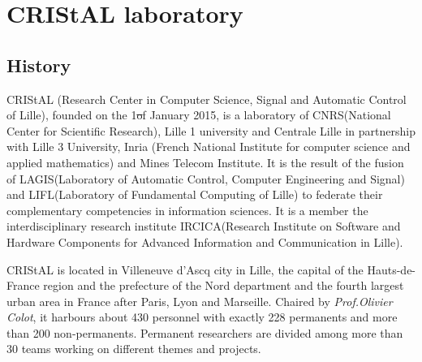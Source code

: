 \chapter{CRIStAL laboratory}

\section{History}

CRIStAL\footnotemark[1]\cite{cristal} (Research Center in Computer Science, Signal and Automatic Control of Lille), founded on the 1\st of January 2015, is a laboratory of CNRS\footnotemark[2] (National Center for Scientific Research), Lille 1 university and Centrale Lille in partnership with Lille 3 University, Inria (French National Institute for computer science and applied mathematics) and Mines Telecom Institute. It is the result of the fusion of LAGIS\footnotemark[4] (Laboratory of Automatic Control, Computer Engineering and Signal) and LIFL\footnotemark[4] (Laboratory of Fundamental Computing of Lille) to federate their complementary competencies in information sciences. It is a member the interdisciplinary research institute IRCICA\footnotemark[5] (Research Institute on Software and Hardware Components for Advanced Information and Communication in Lille). \\






CRIStAL is located in Villeneuve d'Ascq city in Lille, the capital of  the Hauts-de-France region and the prefecture of the Nord department and the fourth largest urban area in France after Paris, Lyon and Marseille. Chaired by \textit{Prof.Olivier Colot}, it harbours about 430 personnel with exactly 228 permanents and more than 200 non-permanents. Permanent researchers are divided among more than 30 teams working on different themes and projects.

